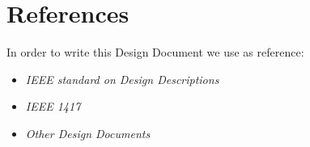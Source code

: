 \section{References}
In order to write this Design Document we use as reference:
\begin{itemize}
	\item \textit{IEEE standard on Design Descriptions}
	\item \textit{IEEE 1417}
	\item \textit{Other Design Documents}
\end{itemize}